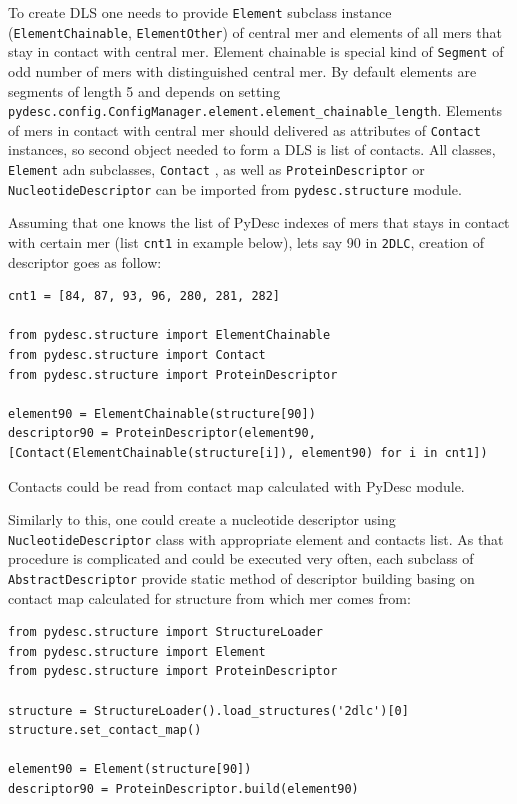 \documentclass{article}
\begin{document}
To create DLS one needs to provide \texttt{Element} subclass instance (\texttt{ElementChainable}, \texttt{ElementOther}) of central mer and elements of all mers that stay in contact with central mer. Element chainable is special kind of \texttt{Segment} of odd number of mers with distinguished central mer. By default elements are segments of length 5 and depends on setting \texttt{pydesc.config.ConfigManager.element.element\_{}chainable\_{}length}.
Elements of mers in contact with central mer should delivered as attributes of \texttt{Contact} instances, so second object needed to form a DLS is list of contacts.
All classes, \texttt{Element} adn subclasses, \texttt{Contact} , as well as \texttt{ProteinDescriptor} or \texttt{NucleotideDescriptor} can be imported from \texttt{pydesc.structure} module.

Assuming that one knows the list of PyDesc indexes of mers that stays in contact with certain mer (list \texttt{cnt1} in example below), lets say 90 in \texttt{2DLC}, creation of descriptor goes as follow:

\begin{lstlisting}
cnt1 = [84, 87, 93, 96, 280, 281, 282]

from pydesc.structure import ElementChainable
from pydesc.structure import Contact
from pydesc.structure import ProteinDescriptor

element90 = ElementChainable(structure[90])
descriptor90 = ProteinDescriptor(element90, [Contact(ElementChainable(structure[i]), element90) for i in cnt1])
\end{lstlisting}

Contacts could be read from contact map calculated with PyDesc module.

Similarly to this, one could create a nucleotide descriptor using \texttt{NucleotideDescriptor} class with appropriate element and contacts list. As that procedure is complicated and could be executed very often, each subclass of \texttt{AbstractDescriptor} provide static method of descriptor building basing on contact map calculated for structure from which mer comes from:

\begin{lstlisting}
from pydesc.structure import StructureLoader
from pydesc.structure import Element
from pydesc.structure import ProteinDescriptor

structure = StructureLoader().load_structures('2dlc')[0]
structure.set_contact_map()

element90 = Element(structure[90])
descriptor90 = ProteinDescriptor.build(element90)
\end{lstlisting}
\end{document}
